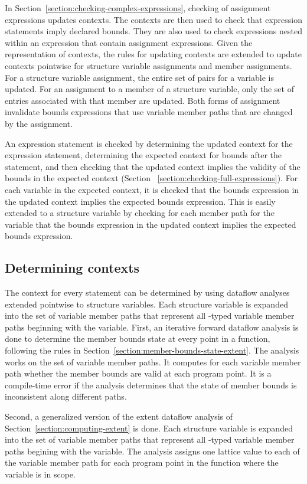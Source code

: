 In Section~\ref{section:checking-complex-expressions}, checking of assignment
expressions updates contexts.  The contexts are then used to check that expression
statements imply declared bounds.  They are also used to check expressions nested
within an expression that contain assignment expressions. 
Given the representation of contexts, the rules for updating contexts
are extended to update contexts pointwise for structure variable assignments and member 
assignments.  For a structure variable assignment, the entire set of pairs for a
variable is updated.  For an assignment to a member of a  structure variable,
only the set of entries  associated with that member are updated.  Both forms of assignment
invalidate bounds expressions that use variable member paths that are changed by the
assignment.

An expression statement is checked by determining the updated context for the
expression statement, determining the expected context for bounds after 
the statement, and then checking that the updated context implies the
validity of the bounds in the expected context (Section ~\ref{section:checking-full-expressions}).
For each variable in the expected context, it is checked that the bounds expression in
the updated context implies the expected bounds expression.  This is easily 
extended to a structure variable by checking for each member path for 
the variable that the bounds expression in the updated context implies
the expected bounds expression.

\subsection{Determining contexts}

The context for every statement can be determined by using dataflow analyses extended
pointwise to structure variables.  Each structure variable is expanded into the set
of variable member paths that represent all \arrayptr-typed variable member paths beginning
with the variable.  First, an iterative forward dataflow analysis is done to determine the
member bounds state at every point in a function, following the rules in
Section~\ref{section:member-bounds-state-extent}.  The analysis works on the set of variable
member paths.   It computes for each variable member path whether the member bounds are valid 
at each program point.  It is a compile-time error if the analysis determines that the state of
member bounds is inconsistent along different paths.

Second, a generalized version of the extent dataflow analysis of Section~\ref{section:computing-extent}
is done.  Each structure variable is expanded into the set of variable
member paths that represent all \arrayptr-typed variable member paths begining with 
the variable.  The analysis assigns one lattice value to each of the variable member path for
each program point in the function where the variable is in scope.

